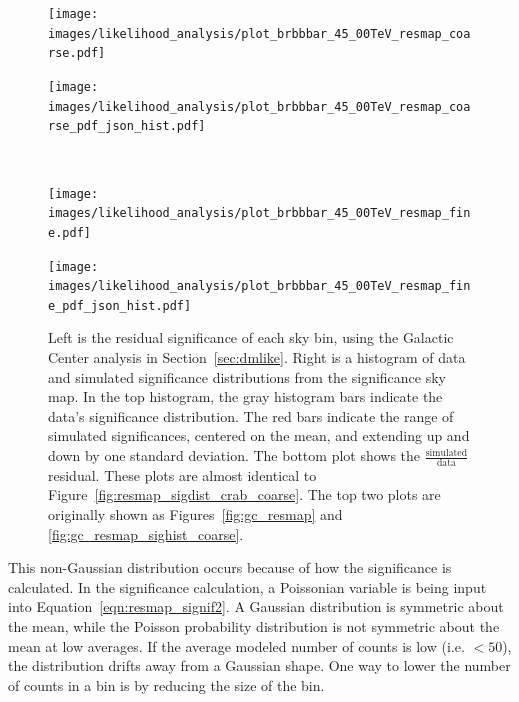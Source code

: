 \begin{figure}[h]
  \centering
  \hfill
  \begin{minipage}{0.43\textwidth}
    \centering
    \texttt{[image: images/likelihood\_analysis/plot\_brbbbar\_45\_00TeV\_resmap\_coarse.pdf]}
  \end{minipage}
  \hfill
  \begin{minipage}{0.48\textwidth}
    \centering
    \texttt{[image: images/likelihood\_analysis/plot\_brbbbar\_45\_00TeV\_resmap\_coarse\_pdf\_json\_hist.pdf]}
  \end{minipage}
  \hfill \\
  \hfill
  \begin{minipage}{0.43\textwidth}
    \centering
    \texttt{[image: images/likelihood\_analysis/plot\_brbbbar\_45\_00TeV\_resmap\_fine.pdf]}
  \end{minipage}
  \hfill
  \begin{minipage}{0.48\textwidth}
    \centering
    \texttt{[image: images/likelihood\_analysis/plot\_brbbbar\_45\_00TeV\_resmap\_fine\_pdf\_json\_hist.pdf]}
  \end{minipage}
  \hfill
  \caption[Galactic Center Residual Sky Maps And Distributions]{
    Left is the residual significance of each sky bin, using the Galactic Center analysis in Section~\ref{sec:dmlike}.
    Right is a histogram of data and simulated significance distributions from the significance sky map.
    In the top histogram, the gray histogram bars indicate the data's significance distribution.
    The red bars indicate the range of simulated significances, centered on the mean, and extending up and down by one standard deviation.
    The bottom plot shows the $\frac{\textrm{simulated}}{\textrm{data}}$ residual.
    These plots are almost identical to Figure~\ref{fig:resmap_sigdist_crab_coarse}.
    The top two plots are originally shown as Figures~\ref{fig:gc_resmap} and \ref{fig:gc_resmap_sighist_coarse}.
  }
  \label{fig:resmap_sigdist_gc}
\end{figure}
    
This non-Gaussian distribution occurs because of how the significance is calculated.
In the significance calculation, a Poissonian variable is being input into Equation~\ref{eqn:resmap_signif2}.
A Gaussian distribution is symmetric about the mean, while the Poisson probability distribution is not symmetric about the mean at low averages.
If the average modeled number of counts is low (i.e. $<50$), the distribution drifts away from a Gaussian shape.
One way to lower the number of counts in a bin is by reducing the size of the bin.

